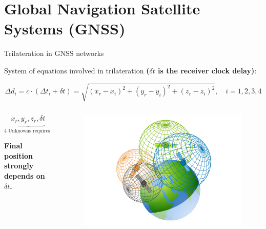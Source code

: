 \section{Global Navigation Satellite Systems (GNSS)}

\begin{frame}{Trilateration in GNSS networks}

    System of equations involved in trilateration \textbf{($\delta t$ is the receiver clock delay)}:

    \begin{equation*}
        \Delta d_i = c \cdot (\Delta t_i + \delta t) = \sqrt{(x_r - x_i)^2 + (y_r - y_i)^2 + (z_r - z_i)^2}, \quad i = 1, 2, 3, 4
    \end{equation*}

    \begin{columns}[c, onlytextwidth]

        \begin{column}{0.6\textwidth}

            \begin{equation*}
                \underbrace{x_r, y_r, z_r, \delta t}_\text{4 Unknowns requires 4 satellites}
            \end{equation*}

            \vspace{10pt}

            \textbf{Final position strongly depends on $\delta t$.}

        \end{column}

        \begin{column}{0.4\textwidth}

            \begin{figure}[H]
                \centering
                \includegraphics[width=\textwidth]{img/GPS-Trilateration.png}
            \end{figure}

        \end{column}

    \end{columns}

\end{frame}



